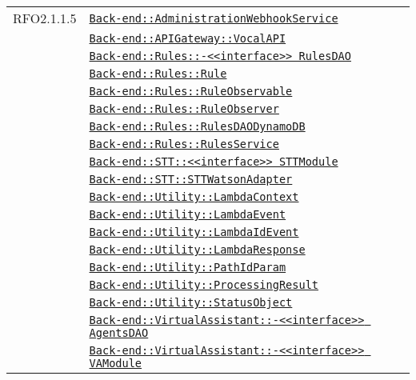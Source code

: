 \begin{longtable}{|>{\centering}m{3cm}|m{10cm}<{\centering}|}
RFO2.1.1.5 & \hyperref[Back-end::AdministrationWebhookService]{\texttt{Back-end::AdministrationWebhookService}}\\
& \hyperref[Back-end::APIGateway::VocalAPI]{\texttt{Back-end::APIGateway::VocalAPI}}\\
& \hyperref[Back-end::Rules::<<interface>> RulesDAO]{\texttt{Back-end::Rules::-\linebreak <<interface>> RulesDAO}}\\
& \hyperref[Back-end::Rules::Rule]{\texttt{Back-end::Rules::Rule}}\\
& \hyperref[Back-end::Rules::RuleObservable]{\texttt{Back-end::Rules::RuleObservable}}\\
& \hyperref[Back-end::Rules::RuleObserver]{\texttt{Back-end::Rules::RuleObserver}}\\
& \hyperref[Back-end::Rules::RulesDAODynamoDB]{\texttt{Back-end::Rules::RulesDAODynamoDB}}\\
& \hyperref[Back-end::Rules::RulesService]{\texttt{Back-end::Rules::RulesService}}\\
& \hyperref[Back-end::STT::<<interface>> STTModule]{\texttt{Back-end::STT::<<interface>> STTModule}}\\
& \hyperref[Back-end::STT::STTWatsonAdapter]{\texttt{Back-end::STT::STTWatsonAdapter}}\\
& \hyperref[Back-end::Utility::LambdaContext]{\texttt{Back-end::Utility::LambdaContext}}\\
& \hyperref[Back-end::Utility::LambdaEvent]{\texttt{Back-end::Utility::LambdaEvent}}\\
& \hyperref[Back-end::Utility::LambdaIdEvent]{\texttt{Back-end::Utility::LambdaIdEvent}}\\
& \hyperref[Back-end::Utility::LambdaResponse]{\texttt{Back-end::Utility::LambdaResponse}}\\
& \hyperref[Back-end::Utility::PathIdParam]{\texttt{Back-end::Utility::PathIdParam}}\\
& \hyperref[Back-end::Utility::ProcessingResult]{\texttt{Back-end::Utility::ProcessingResult}}\\
& \hyperref[Back-end::Utility::StatusObject]{\texttt{Back-end::Utility::StatusObject}}\\
& \hyperref[Back-end::VirtualAssistant::<<interface>> AgentsDAO]{\texttt{Back-end::VirtualAssistant::-\linebreak <<interface>> AgentsDAO}}\\
& \hyperref[Back-end::VirtualAssistant::<<interface>> VAModule]{\texttt{Back-end::VirtualAssistant::-\linebreak <<interface>> VAModule}}\\

\end{longtable}

